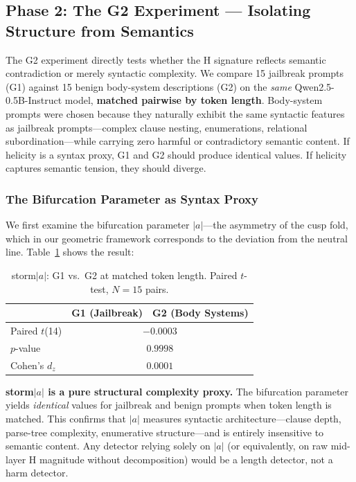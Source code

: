 \documentclass[12pt,a4paper]{article}
\begin{document}
\subsection{Phase 2: The G2 Experiment --- Isolating Structure from Semantics}

The G2 experiment directly tests whether the H signature reflects semantic contradiction or merely syntactic complexity. We compare 15 jailbreak prompts (G1) against 15 benign body-system descriptions (G2) on the \textit{same} Qwen2.5-0.5B-Instruct model, \textbf{matched pairwise by token length}. Body-system prompts were chosen because they naturally exhibit the same syntactic features as jailbreak prompts---complex clause nesting, enumerations, relational subordination---while carrying zero harmful or contradictory semantic content. If helicity is a syntax proxy, G1 and G2 should produce identical values. If helicity captures semantic tension, they should diverge.

\subsubsection{The Bifurcation Parameter as Syntax Proxy}

We first examine the bifurcation parameter $|a|$---the asymmetry of the cusp fold, which in our geometric framework corresponds to the deviation from the neutral line. Table~\ref{tab:g2_storm} shows the result:

\begin{table}[H]
\centering
\caption{storm$|a|$: G1 vs.~G2 at matched token length. Paired $t$-test, $N=15$ pairs.}
\label{tab:g2_storm}
\begin{tabular}{lcc}
\toprule
 & G1 (Jailbreak) & G2 (Body Systems) \\
\midrule
Paired $t$(14) & \multicolumn{2}{c}{$-0.0003$} \\
$p$-value & \multicolumn{2}{c}{$0.9998$} \\
Cohen's $d_z$ & \multicolumn{2}{c}{$0.0001$} \\
\bottomrule
\end{tabular}
\end{table}

\textbf{storm$|a|$ is a pure structural complexity proxy.} The bifurcation parameter yields \textit{identical} values for jailbreak and benign prompts when token length is matched. This confirms that $|a|$ measures syntactic architecture---clause depth, parse-tree complexity, enumerative structure---and is entirely insensitive to semantic content. Any detector relying solely on $|a|$ (or equivalently, on raw mid-layer H magnitude without decomposition) would be a length detector, not a harm detector.
\end{document}
